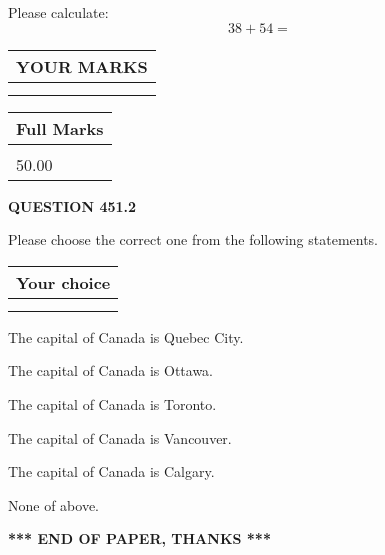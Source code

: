 \documentclass[12pt]{article}
\begin{document}
  
 
Please calculate:
\begin{equation}
38 +  %
54 = \nonumber
\end{equation}
 

 

 
  
\vspace{0.2in}
  
\noindent\begin{tabular}{|l|}
\hline
 YOUR MARKS  \\
\hline
 \\ 
 \\ 
\hline
\end{tabular}
\hspace{0.05in} \begin{tabular}{|l|}
\hline
 Full Marks  \\
\hline
 \\ 
50.00 \\
\hline
\end{tabular}
{\textbf{\Large{QUESTION
451.2 
}}}
  
  
Please choose the correct one from the following statements.
  
  
\noindent\hspace{3.0in} \begin{tabular}{|l|}
\hline
Your choice \\
\hline
 \\ 
 \\ 
\hline
\end{tabular}
  
  
 
 
The capital of Canada is Quebec City.
 
 
The capital of Canada is Ottawa.
 
 
The capital of Canada is Toronto.
 
 
The capital of Canada is Vancouver.
 
 
The capital of Canada is Calgary.
 
 
 None of above.
 
 
   
   
 \vspace{0.2in}
 
   
   
   
   
\vspace{1.0in} 
{\textbf{\large{ *** END OF PAPER, THANKS *** }}} 
   
\end{document}
